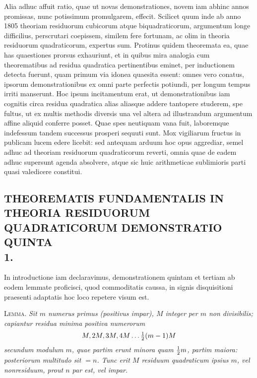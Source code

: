 \documentclass[twoside,12pt, showframe]{memoir}
\let\oldfrac\frac
\def\frac#1#2{\mathchoice{\tfrac{#1}{#2}}{\oldfrac{#1}{#2}}{\genfrac{}{}{}{2}{#1}{#2\mathstrut}}{\genfrac{}{}{}{3}{#1}{#2\mathstrut}}}
\begin{document}
Alia adhuc affuit ratio, quae ut novas demonstrationes, novem iam abhinc annos promissas, nunc potissimum promulgarem, effecit. Scilicet quum inde ab anno 1805 theoriam residuorum cubicorum atque biquadraticorum, argumentum longe difficilius, perscrutari coepissem, similem fere fortunam, ac olim in theoria residuorum quadraticorum, expertus sum. Protinus quidem theoremata ea, quae has quaestiones prorsus exhauriunt, et in quibus mira analogia cum theorematibus ad residua quadratica pertinentibus eminet, per inductionem detecta fuerunt, quam primum via idonea quaesita essent: omnes vero conatus, ipsorum demonstrationibus ex omni parte perfectis potiundi, per longum tempus irriti manserunt. Hoc ipsum incitamentum erat, ut demonstrationibus iam cognitis circa residua quadratica alias aliasque addere tantopere studerem, spe fultus, ut ex multis methodis diversis una vel altera ad illustrandum argumentum affine aliquid conferre posset. Quae spes neutiquam vana fuit, laboremque indefessum tandem successus prosperi sequuti sunt. Mox vigiliarum fructus in publicam lucem edere licebit: sed antequam arduum hoc opus aggrediar, semel adhuc ad theoriam residuorum quadraticorum reverti, omnia quae de eadem adhuc supersunt agenda absolvere, atque sic huic arithmeticae sublimioris parti quasi valedicere constitui.\clearpage\noindent%

\subsection*{{\scriptsize THEOREMATIS FUNDAMENTALIS IN THEORIA RESIDUORUM QUADRATICORUM DEMONSTRATIO QUINTA}\\[0.5\baselineskip]
1.}
 
In introductione iam declaravimus, demonstrationem quintam et tertiam ab eodem lemmate proficisci, quod commoditatis caussa, in signis disquisitioni praesenti adaptatis hoc loco repetere visum est.

\textsc{Lemma.} \textit{Sit \(m\) numerus primus (positivus impar), \(M\) integer per \(m\) non divisibilis; capiantur residua minima positiva numerorum}
\[M, 2 M, 3 M, 4 M \ldots \frac{1}{2}(m-1) M\]
\textit{secundum modulum \(m\), quae partim erunt minora quam \(\frac{1}{2} m\), partim maiora: posteriorum multitudo sit \(=n\). Tunc erit \(M\) residuum quadraticum ipsius \(m\), vel nonresiduum, prout \(n\) par est, vel impar.}
 
\end{document}
